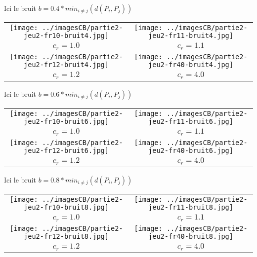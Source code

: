 \documentclass[11pt,a4paper]{article}
\begin{document}
\pagebreak

Ici le bruit $b=0.4*min_{i \neq j}(d(P_i,P_j))$
\begin{center}
\begin{tabular}{|c|c|}
\hline
\texttt{[image: ../imagesCB/partie2-jeu2-fr10-bruit4.jpg]} & \texttt{[image: ../imagesCB/partie2-jeu2-fr11-bruit4.jpg]} \\
$c_r=1.0$                                                             & $c_r=1.1$ \\
\hline
\texttt{[image: ../imagesCB/partie2-jeu2-fr12-bruit4.jpg]} & \texttt{[image: ../imagesCB/partie2-jeu2-fr40-bruit4.jpg]} \\
$c_r=1.2$                                                             & $c_r=4.0$ \\
\hline
\end{tabular}
\end{center}

\pagebreak

Ici le bruit $b=0.6*min_{i \neq j}(d(P_i,P_j))$
\begin{center}
\begin{tabular}{|c|c|}
\hline
\texttt{[image: ../imagesCB/partie2-jeu2-fr10-bruit6.jpg]} & \texttt{[image: ../imagesCB/partie2-jeu2-fr11-bruit6.jpg]} \\
$c_r=1.0$                                                             & $c_r=1.1$ \\
\hline
\texttt{[image: ../imagesCB/partie2-jeu2-fr12-bruit6.jpg]} & \texttt{[image: ../imagesCB/partie2-jeu2-fr40-bruit6.jpg]} \\
$c_r=1.2$                                                             & $c_r=4.0$ \\
\hline
\end{tabular}
\end{center}

\pagebreak

Ici le bruit $b=0.8*min_{i \neq j}(d(P_i,P_j))$
\begin{center}
\begin{tabular}{|c|c|}
\hline
\texttt{[image: ../imagesCB/partie2-jeu2-fr10-bruit8.jpg]} & \texttt{[image: ../imagesCB/partie2-jeu2-fr11-bruit8.jpg]} \\
$c_r=1.0$                                                             & $c_r=1.1$ \\
\hline
\texttt{[image: ../imagesCB/partie2-jeu2-fr12-bruit8.jpg]} & \texttt{[image: ../imagesCB/partie2-jeu2-fr40-bruit8.jpg]} \\
$c_r=1.2$                                                             & $c_r=4.0$ \\
\hline
\end{tabular}
\end{center}
\end{document}
